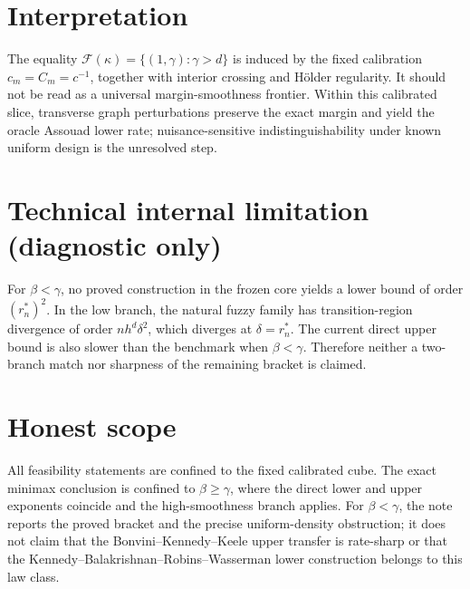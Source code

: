 \documentclass{article}
\begin{document}
\section{Interpretation}

The equality \(\mathcal F(\kappa)=\{(1,\gamma):\gamma>d\}\) is induced by the fixed calibration \(c_m=C_m=c^{-1}\), together with interior crossing and Hölder regularity. It should not be read as a universal margin-smoothness frontier. Within this calibrated slice, transverse graph perturbations preserve the exact margin and yield the oracle Assouad lower rate; nuisance-sensitive indistinguishability under known uniform design is the unresolved step.

\section*{Technical internal limitation (diagnostic only)}

For \(\beta<\gamma\), no proved construction in the frozen core yields a lower bound of order \((r_n^*)^2\). In the low branch, the natural fuzzy family has transition-region divergence of order \(n h^d\delta^2\), which diverges at \(\delta=r_n^*\). The current direct upper bound is also slower than the benchmark when \(\beta<\gamma\). Therefore neither a two-branch match nor sharpness of the remaining bracket is claimed.

\section{Honest scope}

All feasibility statements are confined to the fixed calibrated cube. The exact minimax conclusion is confined to \(\beta\ge\gamma\), where the direct lower and upper exponents coincide and the high-smoothness branch applies. For \(\beta<\gamma\), the note reports the proved bracket and the precise uniform-density obstruction; it does not claim that the Bonvini--Kennedy--Keele upper transfer is rate-sharp or that the Kennedy--Balakrishnan--Robins--Wasserman lower construction belongs to this law class.
\end{document}
